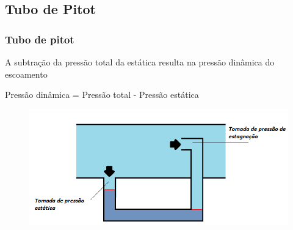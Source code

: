 \subsection{Tubo de Pitot}

\begin{frame}
\frametitle{Tubo de pitot}

A subtração da pressão total da estática resulta na pressão dinâmica do escoamento

Pressão dinâmica = Pressão total - Pressão estática

\begin{figure}
\centering
\includegraphics[scale = 0.5]{figs/pestagnacao}
\end{figure}

\end{frame}